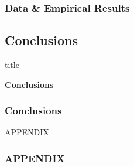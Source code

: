 \documentclass[11pt]{beamer}
\begin{document}
\begin{frame}

	\frametitle{\bfseries Data \& Empirical Results}
\end{frame}

\begin{frame}
	\section[Conclusions]{Conclusions}
	
	\begin{beamercolorbox}{title}
		\begin{center}
			\bfseries \huge Conclusions
		\end{center}	
	\end{beamercolorbox}
	
\end{frame}

\begin{frame}

	\frametitle{\bfseries Conclusions}
\end{frame}



\begin{frame}
	
	\begin{center}
		APPENDIX
	\end{center}
	\frametitle{\bfseries APPENDIX}
\end{frame}
\end{document}
